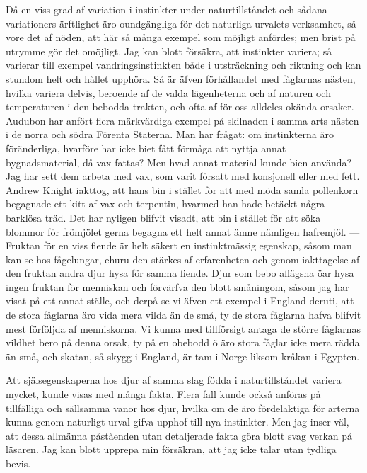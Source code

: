 Då en viss grad af variation i instinkter under naturtillståndet och sådana variationers ärftlighet äro oundgängliga för det naturliga urvalets verksamhet, så vore det af nöden, att här så många exempel som möjligt anfördes; men brist på utrymme gör det omöjligt. Jag kan blott försäkra, att instinkter variera; så varierar till exempel vandringsinstinkten både i utsträckning och riktning och kan stundom helt och hållet upphöra. Så är äfven förhållandet med fåglarnas nästen, hvilka variera delvis, beroende af de valda lägenheterna och af naturen och temperaturen i den bebodda trakten, och ofta af för oss alldeles okända orsaker. Audubon har anfört flera märkvärdiga exempel på skilnaden i samma arts nästen i de norra och södra Förenta Staterna. Man har frågat: om instinkterna äro föränderliga, hvarföre har icke biet fått förmåga att nyttja annat bygnadsmaterial, då vax fattas? Men hvad annat material kunde bien använda? Jag har sett dem arbeta med vax, som varit försatt med konsjonell eller med fett. Andrew Knight iakttog, att hans bin i stället för att med möda samla pollenkorn begagnade ett kitt af vax och terpentin, hvarmed han hade betäckt några barklösa träd. Det har nyligen blifvit visadt, att bin i stället för att söka blommor för frömjölet gerna begagna ett helt annat ämne nämligen hafremjöl. — Fruktan för en viss fiende är helt säkert en instinktmässig egenskap, såsom man kan se hos fågelungar, ehuru den stärkes af erfarenheten och genom iakttagelse af den fruktan andra djur hysa för samma fiende. Djur som bebo aflägsna öar hysa ingen fruktan för menniskan och förvärfva den blott småningom, såsom jag har visat på ett annat ställe, och derpå se vi äfven ett exempel i England deruti, att de stora fåglarna äro vida mera vilda än de små, ty de stora fåglarna hafva blifvit mest förföljda af menniskorna. Vi kunna med tillförsigt antaga de större fåglarnas vildhet bero på denna orsak, ty på en obebodd ö äro stora fåglar icke mera rädda än små, och skatan, så skygg i England, är tam i Norge liksom kråkan i Egypten.

Att själsegenskaperna hos djur af samma slag födda i naturtillståndet variera mycket, kunde visas med många fakta. Flera fall kunde också anföras på tillfälliga och sällsamma vanor hos djur, hvilka om de äro fördelaktiga för arterna kunna genom naturligt urval gifva upphof till nya instinkter. Men jag inser väl, att dessa allmänna påståenden utan detaljerade fakta göra blott svag verkan på läsaren. Jag kan blott upprepa min försäkran, att jag icke talar utan tydliga bevis.



